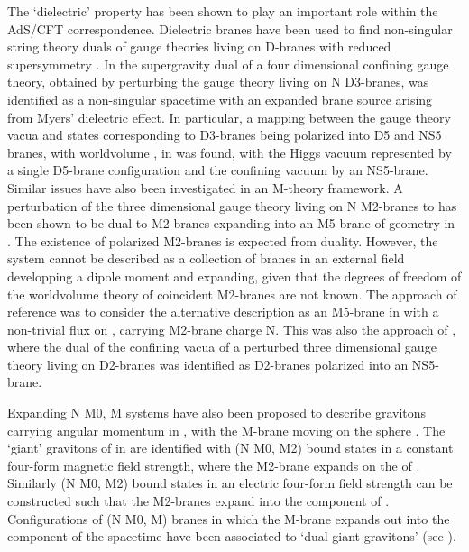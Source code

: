 \documentclass[12pt,a4paper]{article}
\begin{document}
The `dielectric' property has been shown to play an important role 
within the AdS/CFT correspondence. Dielectric branes have been used
to find non-singular string theory duals of gauge theories living on
D-branes with reduced supersymmetry \cite{PS,AR,Bena}.
In \cite{PS} the supergravity dual of a four dimensional 
\coordHE{} confining gauge theory, obtained by perturbing the
\coordHE{} gauge theory living on N D3-branes, was identified
as a non-singular spacetime with an expanded brane source 
arising from Myers' 
dielectric effect. In particular, a mapping between the
gauge theory vacua and states corresponding to D3-branes being
polarized into D5 and NS5 branes, with worldvolume \coordHE{},
in \coordHE{} was found, with the Higgs vacuum
represented by a single D5-brane configuration and the confining
vacuum by an NS5-brane.
Similar issues have also been investigated in an M-theory 
framework. A perturbation of the \coordHE{} three dimensional 
gauge theory living on N M2-branes to \coordHE{}
has been shown to be dual to
M2-branes expanding into an M5-brane of geometry \coordHE{}
in \coordHE{} \cite{Bena2}.
The existence of polarized M2-branes is expected from duality. 
However, the system cannot be described as a collection of branes 
in an external field developping a dipole moment and expanding,
given that the degrees of freedom of the worldvolume theory of
coincident M2-branes are not
known. The approach of reference \cite{Bena2} was to consider the 
alternative description as an 
M5-brane in \coordHE{}
with a non-trivial flux on \coordHE{}, carrying 
M2-brane charge N. This was also the approach of \cite{Bena}, where
the dual of the confining vacua of a perturbed three dimensional
gauge theory living on D2-branes was identified as
D2-branes polarized into an NS5-brane. 

Expanding N M0, M\coordHE{} systems have also been proposed to describe 
gravitons carrying angular momentum in \coordHE{},
with the M\coordHE{}-brane moving on the \coordHE{} sphere \cite{GST}. 
The `giant' gravitons of \cite{GST} in \coordHE{} are 
identified with (N M0, M2)
bound states in a constant four-form magnetic field strength,
where the M2-brane expands on the \coordHE{} of \coordHE{}
\cite{DTV}. Similarly (N M0, M2) bound states in an electric four-form
field strength can be constructed such that the M2-branes expand into 
the \coordHE{}
component of \coordHE{}. Configurations of (N M0, M\coordHE{}) branes
in which the M\coordHE{}-brane expands out into
the \coordHE{} component of the spacetime have been associated to
`dual giant gravitons' (see \cite{GMT}).
\end{document}
